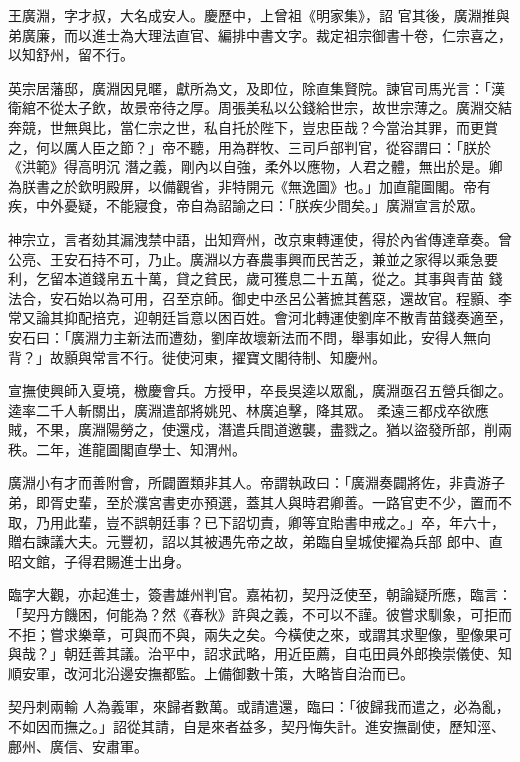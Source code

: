 \begin{pinyinscope}
 王廣淵，字才叔，大名成安人。慶歷中，上曾祖《明家集》，詔
 官其後，廣淵推與弟廣廉，而以進士為大理法直官、編排中書文字。裁定祖宗御書十卷，仁宗喜之，以知舒州，留不行。



 英宗居藩邸，廣淵因見暱，獻所為文，及即位，除直集賢院。諫官司馬光言：「漢衛綰不從太子飲，故景帝待之厚。周張美私以公錢給世宗，故世宗薄之。廣淵交結奔競，世無與比，當仁宗之世，私自托於陛下，豈忠臣哉？今當治其罪，而更賞之，何以厲人臣之節？」帝不聽，用為群牧、三司戶部判官，從容謂曰：「朕於《洪範》得高明沉
 潛之義，剛內以自強，柔外以應物，人君之體，無出於是。卿為朕書之於欽明殿屏，以備觀省，非特開元《無逸圖》也。」加直龍圖閣。帝有疾，中外憂疑，不能寢食，帝自為詔諭之曰：「朕疾少間矣。」廣淵宣言於眾。



 神宗立，言者劾其漏洩禁中語，出知齊州，改京東轉運使，得於內省傳達章奏。曾公亮、王安石持不可，乃止。廣淵以方春農事興而民苦乏，兼並之家得以乘急要利，乞留本道錢帛五十萬，貸之貧民，歲可獲息二十五萬，從之。其事與青苗
 錢法合，安石始以為可用，召至京師。御史中丞呂公著摭其舊惡，還故官。程顥、李常又論其抑配掊克，迎朝廷旨意以困百姓。會河北轉運使劉庠不散青苗錢奏適至，安石曰：「廣淵力主新法而遭劾，劉庠故壞新法而不問，舉事如此，安得人無向背？」故顥與常言不行。徙使河東，擢寶文閣待制、知慶州。



 宣撫使興師入夏境，檄慶會兵。方授甲，卒長吳逵以眾亂，廣淵亟召五營兵御之。逵率二千人斬關出，廣淵遣部將姚兕、林廣追擊，降其眾。
 柔遠三都戍卒欲應賊，不果，廣淵陽勞之，使還戍，潛遣兵間道邀襲，盡戮之。猶以盜發所部，削兩秩。二年，進龍圖閣直學士、知渭州。



 廣淵小有才而善附會，所闢置類非其人。帝謂執政曰：「廣淵奏闢將佐，非貴游子弟，即胥史輩，至於濮宮書吏亦預選，蓋其人與時君卿善。一路官吏不少，置而不取，乃用此輩，豈不誤朝廷事？已下詔切責，卿等宜貽書申戒之。」卒，年六十，贈右諫議大夫。元豐初，詔以其被遇先帝之故，弟臨自皇城使擢為兵部
 郎中、直昭文館，子得君賜進士出身。



 臨字大觀，亦起進士，簽書雄州判官。嘉祐初，契丹泛使至，朝論疑所應，臨言：「契丹方饑困，何能為？然《春秋》許與之義，不可以不謹。彼嘗求馴象，可拒而不拒；嘗求樂章，可與而不與，兩失之矣。今橫使之來，或謂其求聖像，聖像果可與哉？」朝廷善其議。治平中，詔求武略，用近臣薦，自屯田員外郎換崇儀使、知順安軍，改河北沿邊安撫都監。上備御數十策，大略皆自治而已。



 契丹刺兩輸
 人為義軍，來歸者數萬。或請遣還，臨曰：「彼歸我而遣之，必為亂，不如因而撫之。」詔從其請，自是來者益多，契丹悔失計。進安撫副使，歷知涇、鄜州、廣信、安肅軍。




\end{pinyinscope}
